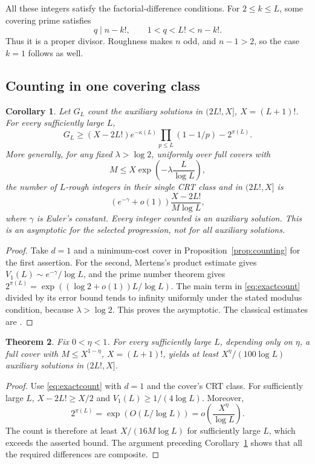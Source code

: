 \documentclass[11pt]{amsart}
\newtheorem{theorem}{Theorem}[section]
\newtheorem{corollary}[theorem]{Corollary}
\theoremstyle{definition}
\theoremstyle{remark}
\begin{document}
All these integers satisfy the factorial-difference conditions. For
$2\leq k\leq L$, some covering prime satisfies
\[
q\mid n-k!,\qquad 1<q<L!<n-k!.
\]
Thus it is a proper divisor. Roughness makes $n$ odd, and $n-1>2$,
so the case $k=1$ follows as well.

\subsection{Counting in one covering class}

\begin{corollary}\label{cor:costcount}
Let $G_L$ count the auxiliary solutions in $(2L!,X]$, $X=(L+1)!$.
For every sufficiently large $L$,
\[
G_L\geq (X-2L!)e^{-\kappa(L)}
\prod_{p\leq L}(1-1/p)-2^{\pi(L)}.
\]
More generally, for any fixed $\lambda>\log2$, uniformly over full
covers with
\[
M\leq X\exp\left(-\lambda\frac{L}{\log L}\right),
\]
the number of $L$-rough integers in their single CRT class and in
$(2L!,X]$ is
\[
(e^{-\gamma}+o(1))\frac{X-2L!}{M\log L},
\]
where $\gamma$ is Euler's constant. Every integer counted is an auxiliary
solution. This is an asymptotic for the selected progression, not for
all auxiliary solutions.
\end{corollary}
\begin{proof}
Take $d=1$ and a minimum-cost cover in
Proposition~\ref{prop:counting} for the first assertion.
For the second, Mertens's product estimate gives
$V_1(L)\sim e^{-\gamma}/\log L$, and the prime number theorem gives
$2^{\pi(L)}=\exp((\log2+o(1))L/\log L)$.
The main term in \eqref{eq:exactcount} divided by its error bound tends
to infinity uniformly under the stated modulus condition, because
$\lambda>\log2$. This proves the asymptotic. The classical estimates are
\cite[Theorems~3.4(c) and~8.1]{Koukoulopoulos}.
\end{proof}

\begin{theorem}\label{thm:transference}
Fix $0<\eta<1$. For every sufficiently large $L$, depending only on
$\eta$, a full cover with $M\leq X^{1-\eta}$, $X=(L+1)!$, yields at
least $X^\eta/(100\log L)$ auxiliary solutions in $(2L!,X]$.
\end{theorem}
\begin{proof}
Use \eqref{eq:exactcount} with $d=1$ and the cover's CRT class.
For sufficiently large $L$, $X-2L!\geq X/2$ and
$V_1(L)\geq1/(4\log L)$. Moreover,
\[
2^{\pi(L)}=\exp(O(L/\log L))
=o\left(\frac{X^\eta}{\log L}\right).
\]
The count is therefore at least $X/(16M\log L)$ for sufficiently
large $L$, which exceeds the asserted bound. The argument preceding
Corollary~\ref{cor:costcount} shows that all the required differences
are composite.
\end{proof}
\end{document}
